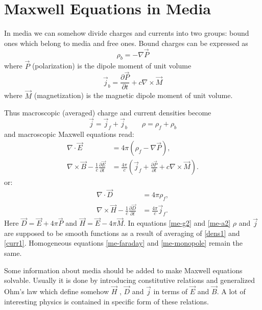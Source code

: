 \section{Maxwell Equations in Media}
\label{maxwell-eqs}


In media we can somehow divide charges and currents into two groups: 
bound ones which belong to media and free ones.
Bound charges can be expressed as
\begin{equation}
   \label {bound-charge}
   \rho_b=-\nabla \vec P
\end{equation}
where $ \vec P $  (polarization) is the dipole moment of unit volume
\begin{equation}
   \label {bound-current}
   \vec j_b =\frac{\partial \vec P}{\partial t}+ c \nabla \times \vec M
\end{equation}
where $ \vec M$ (magnetization) is the magnetic dipole moment of unit volume.

Thus macroscopic (averaged) charge and current densities become
\begin{equation}
   \label {tot-cur-ch}
   \vec j=\vec j_f+ \vec j_b \qquad \rho=\rho_f+\rho_b
\end{equation}
and macroscopic Maxwell equations read:
\begin{align}
    \nabla \cdot \vec{E} &= 4\pi (\rho_f -\nabla \vec P), \label{me-g1} \\
    \nabla \times \vec{B} - \frac{1}{c}\frac{\partial \vec{E}}{\partial t} &= 
    \frac{4\pi}{c}(\vec j_f+\frac{\partial \vec P}{\partial t}+ c \nabla \times \vec M). \label{me-a1}
\end{align}
or:
\begin{align}
    \nabla \cdot \vec D &= 4\pi \rho_f , \label{me-g2} \\
    \nabla \times \vec H - \frac{1}{c}\frac{\partial \vec D}{\partial t} &= \frac{4\pi}{c}\vec j_f . \label{me-a2}
\end{align}
Here $ \vec D = \vec E+4 \pi \vec P $ and $ \vec H = \vec E-4 \pi \vec M $.
In equations \eqref{me-g2} and \eqref{me-a2} $ \rho $ and $ \vec j $ are supposed to be smooth
functions as a result of averaging of \eqref{dens1} and \eqref{curr1}.
Homogeneous equations \eqref{me-faraday} and \eqref{me-monopole} remain the same.  

Some information about media should be added to make Maxwell
equations solvable. Usually it is done by introducing constitutive
relations and generalized Ohm's law which define somehow 
$ \vec H $ , $ \vec D $ and $ \vec j $ in terms of 
$ \vec E $ and $ \vec B $. A lot of interesting physics
is contained in specific form of these relations.


